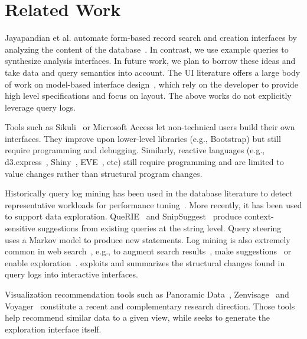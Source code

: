 \section{Related Work}


Jayapandian et al. automate form-based record search and creation interfaces by analyzing the content of the database~\cite{jayapandian2008automated}. In contrast, we use example queries to synthesize analysis interfaces. In future work, we plan to borrow these ideas and take data and query semantics into account. The UI literature offers a large body of work on model-based interface design~\cite{puerta1994model, vanderdonckt1994automatic, nichols2004improving}, which rely on the developer to provide high level specifications and focus on layout. The above works do not explicitly leverage query logs.

 Tools such as Sikuli~\cite{yeh2009sikuli} or Microsoft Access let non-technical users build their own interfaces. They improve upon lower-level libraries (e.g., Bootstrap) but still require programming and debugging. Similarly, reactive languages (e.g., d3.express~\cite{d3express}, Shiny~\cite{chang2015shiny}, EVE~\cite{eve}, etc) still require programming and are limited to value changes rather than structural program changes.

 Historically query log mining has been used in the database literature to detect representative workloads for performance tuning~\cite{chaudhuri1998autoadmin,hellerstein2007architecture}. More recently, it has been used to support data exploration. QueRIE~\cite{eirinaki2014querie} and SnipSuggest~\cite{khoussainova2010snipsuggest} produce context-sensitive suggestions from existing queries at the string level. Query steering~\cite{dimitriadou2014explore} uses a Markov model to produce new statements. Log mining is also extremely common in web search~\cite{silvestri2009mining}, e.g., to augment search results~\cite{hearst2009search}, make suggestions~\cite{cai2016survey} or enable exploration~\cite{chirigati2016knowledge}. \sys exploits and summarizes the structural changes found in query logs into interactive interfaces.

 Visualization recommendation tools such as Panoramic Data~\cite{zgraggen2014panoramicdata}, Zenvisage~\cite{siddiqui2016effortless} and Voyager~\cite{wongsuphasawat2016voyager} constitute a recent and complementary research direction. Those tools help recommend similar data to a given view, while \sys seeks to generate the exploration interface itself.

